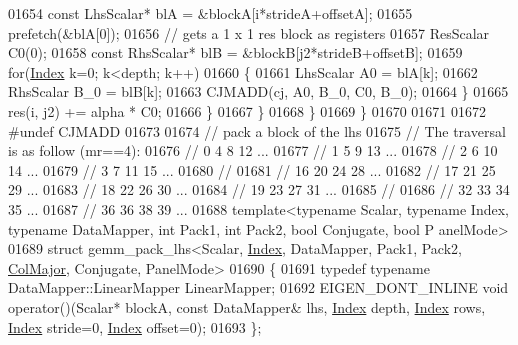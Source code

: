 \begin{DoxyCode}
01654           \textcolor{keyword}{const} LhsScalar* blA = &blockA[i*strideA+offsetA];
01655           prefetch(&blA[0]);
01656           \textcolor{comment}{// gets a 1 x 1 res block as registers}
01657           ResScalar C0(0);
01658           \textcolor{keyword}{const} RhsScalar* blB = &blockB[j2*strideB+offsetB];
01659           \textcolor{keywordflow}{for}(\hyperlink{namespace_eigen_a62e77e0933482dafde8fe197d9a2cfde}{Index} k=0; k<depth; k++)
01660           \{
01661             LhsScalar A0 = blA[k];
01662             RhsScalar B\_0 = blB[k];
01663             CJMADD(cj, A0, B\_0, C0, B\_0);
01664           \}
01665           res(i, j2) += alpha * C0;
01666         \}
01667       \}
01668     \}
01669   \}
01670 
01671 
01672 \textcolor{preprocessor}{#undef CJMADD}
01673 
01674 \textcolor{comment}{// pack a block of the lhs}
01675 \textcolor{comment}{// The traversal is as follow (mr==4):}
01676 \textcolor{comment}{//   0  4  8 12 ...}
01677 \textcolor{comment}{//   1  5  9 13 ...}
01678 \textcolor{comment}{//   2  6 10 14 ...}
01679 \textcolor{comment}{//   3  7 11 15 ...}
01680 \textcolor{comment}{//}
01681 \textcolor{comment}{//  16 20 24 28 ...}
01682 \textcolor{comment}{//  17 21 25 29 ...}
01683 \textcolor{comment}{//  18 22 26 30 ...}
01684 \textcolor{comment}{//  19 23 27 31 ...}
01685 \textcolor{comment}{//}
01686 \textcolor{comment}{//  32 33 34 35 ...}
01687 \textcolor{comment}{//  36 36 38 39 ...}
01688 \textcolor{keyword}{template}<\textcolor{keyword}{typename} Scalar, \textcolor{keyword}{typename} Index, \textcolor{keyword}{typename} DataMapper, \textcolor{keywordtype}{int} Pack1, \textcolor{keywordtype}{int} Pack2, \textcolor{keywordtype}{bool} Conjugate, \textcolor{keywordtype}{bool} P
      anelMode>
01689 \textcolor{keyword}{struct }gemm\_pack\_lhs<Scalar, \hyperlink{namespace_eigen_a62e77e0933482dafde8fe197d9a2cfde}{Index}, DataMapper, Pack1, Pack2, \hyperlink{group__enums_ggaacded1a18ae58b0f554751f6cdf9eb13a0cbd4bdd0abcfc0224c5fcb5e4f6669a}{ColMajor}, Conjugate, PanelMode>
01690 \{
01691   \textcolor{keyword}{typedef} \textcolor{keyword}{typename} DataMapper::LinearMapper LinearMapper;
01692   EIGEN\_DONT\_INLINE \textcolor{keywordtype}{void} operator()(Scalar* blockA, \textcolor{keyword}{const} DataMapper& lhs, \hyperlink{namespace_eigen_a62e77e0933482dafde8fe197d9a2cfde}{Index} depth, 
      \hyperlink{namespace_eigen_a62e77e0933482dafde8fe197d9a2cfde}{Index} rows, \hyperlink{namespace_eigen_a62e77e0933482dafde8fe197d9a2cfde}{Index} stride=0, \hyperlink{namespace_eigen_a62e77e0933482dafde8fe197d9a2cfde}{Index} offset=0);
01693 \};

\end{DoxyCode}
